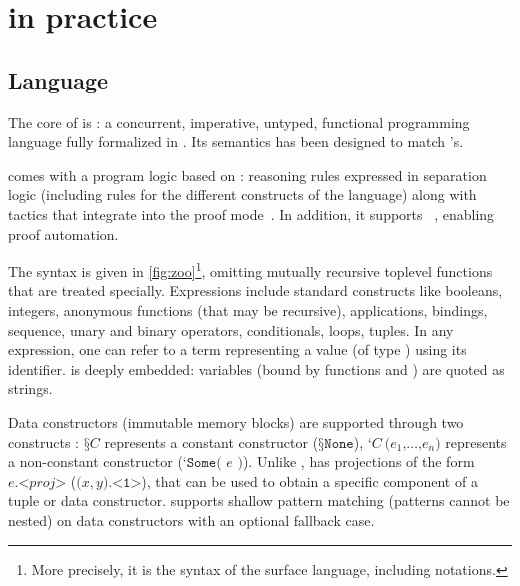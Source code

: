 \section{\Zoo in practice}
\label{sec:zoo}


\subsection{Language}

The core of \Zoo is \ZooLang: a concurrent, imperative, untyped, functional programming language fully formalized in \Rocq.
Its semantics has been designed to match \OCaml's.

\ZooLang comes with a program logic based on \Iris: reasoning rules expressed in separation logic (including rules for the different constructs of the language) along with \Rocq tactics that integrate into the \Iris proof mode~\cite{DBLP:conf/popl/KrebbersTB17,DBLP:journals/pacmpl/KrebbersJ0TKTCD18}.
In addition, it supports \Diaframe~\cite{DBLP:conf/pldi/MulderKG22,DBLP:journals/pacmpl/MulderK23}, enabling proof automation.



The \ZooLang syntax is given in \cref{fig:zoo}\footnote{More precisely, it is the syntax of the surface language, including \Rocq notations.}, omitting mutually recursive toplevel functions that are treated specially.
Expressions include standard constructs like booleans, integers, anonymous functions (that may be recursive), applications,  bindings, sequence, unary and binary operators, conditionals,  loops, tuples.
In any expression, one can refer to a \Rocq term representing a \ZooLang value (of type ) using its \Rocq identifier.
\ZooLang is deeply embedded: variables (bound by functions and ) are quoted as strings.

Data constructors (immutable memory blocks) are supported through two constructs : $\texttt{§}C$ represents a constant constructor (\eg $\texttt{§}\texttt{None}$), $\texttt{‘} C\ \texttt{(} e_1 \texttt{,} \dots \texttt{,} e_n \texttt{)}$ represents a non-constant constructor (\eg $\texttt{‘} \texttt{Some( } e \texttt{ )}$).
Unlike \OCaml, \ZooLang has projections of the form $e \texttt{.<} \mathit{proj} \texttt{>}$ (\eg $\texttt{(} x, y \texttt{).<1>}$), that can be used to obtain a specific component of a tuple or data constructor.
\ZooLang supports shallow pattern matching (patterns cannot be nested) on data constructors with an optional fallback case.

